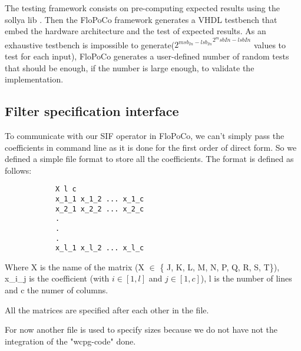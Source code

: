 	The testing framework consists on pre-computing expected results using the sollya lib \cite{ChevillardJoldesLauter2010}.
	Then the FloPoCo framework generates a VHDL testbench that embed the hardware architecture and the test of expected results.
	As an exhaustive testbench is impossible to generate(${2^{msb_{In} - lsb_{In}}}^{2^msb{In} - lsb{In}}$ values to test for each input),
	FloPoCo generates a user-defined number of random tests that should be enough, if the number is large enough, to validate the implementation.

		\subsection{Filter specification interface}
		To communicate with our SIF operator in FloPoCo, we can't simply pass the coefficients in command line as it is done for the first order of direct form.
		So we defined a simple file format to store all the coefficients.
		The format is defined as follows:

		\begin{verbatim}
			X l c
			x_1_1 x_1_2 ... x_1_c
			x_2_1 x_2_2 ... x_2_c
			.
			.
			.
			x_l_1 x_l_2 ... x_l_c
		\end{verbatim}

		Where X is the name of the matrix (X $\in$ \{ J, K, L, M, N, P, Q, R, S, T\}), x\_i\_j is the coefficient (with $i \in [1, l]$ and $j \in [1, c]$), l is the number of lines and c the numer of columns.

		All the matrices are specified after each other in the file.

		For now another file is used to specify sizes because we do not have not the integration of the "wcpg-code" done.



